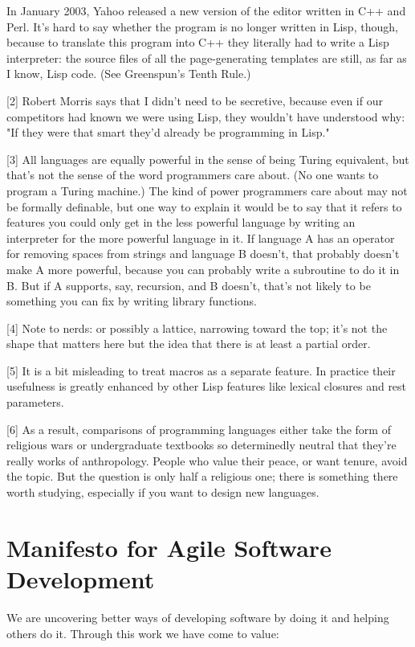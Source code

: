 \documentclass[10pt,twoside,openright]{memoir}
\begin{document}
In January 2003, Yahoo released a new version of the editor written in C++ and Perl. It's hard to say whether the program is no longer written in Lisp, though, because to translate this program into C++ they literally had to write a Lisp interpreter: the source files of all the page-generating templates are still, as far as I know, Lisp code. (See Greenspun's Tenth Rule.)

[2] Robert Morris says that I didn't need to be secretive, because even if our competitors had known we were using Lisp, they wouldn't have understood why: "If they were that smart they'd already be programming in Lisp."

[3] All languages are equally powerful in the sense of being Turing equivalent, but that's not the sense of the word programmers care about. (No one wants to program a Turing machine.) The kind of power programmers care about may not be formally definable, but one way to explain it would be to say that it refers to features you could only get in the less powerful language by writing an interpreter for the more powerful language in it. If language A has an operator for removing spaces from strings and language B doesn't, that probably doesn't make A more powerful, because you can probably write a subroutine to do it in B. But if A supports, say, recursion, and B doesn't, that's not likely to be something you can fix by writing library functions.

[4] Note to nerds: or possibly a lattice, narrowing toward the top; it's not the shape that matters here but the idea that there is at least a partial order.

[5] It is a bit misleading to treat macros as a separate feature. In practice their usefulness is greatly enhanced by other Lisp features like lexical closures and rest parameters.

[6] As a result, comparisons of programming languages either take the form of religious wars or undergraduate textbooks so determinedly neutral that they're really works of anthropology. People who value their peace, or want tenure, avoid the topic. But the question is only half a religious one; there is something there worth studying, especially if you want to design new languages.


\chapter{Manifesto for Agile Software Development}

We are uncovering better ways of developing software by doing it and helping others do it. Through this work we have come to value:
\end{document}
